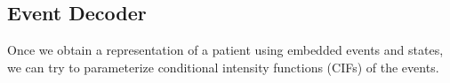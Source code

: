 \documentclass[journal,twoside,web]{ieeecolor}
\begin{document}















\subsection{Event Decoder}
Once we obtain a representation of a patient using embedded events and states, we can try to parameterize conditional intensity functions (CIFs) of the events.
\end{document}
